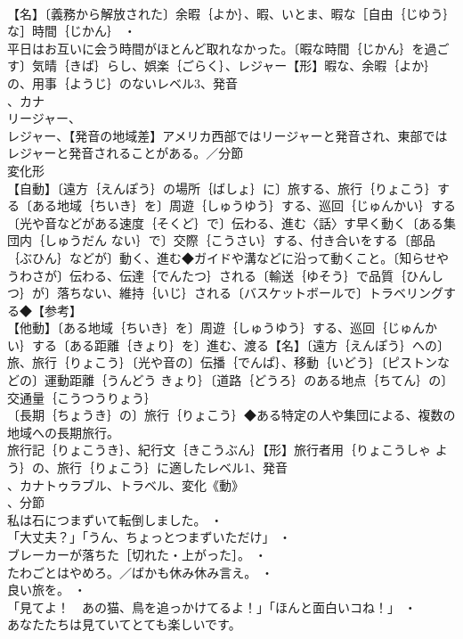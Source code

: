 \documentclass[8pt]{extreport}
\begin{document}
\begin{CJK}{UTF8}{min}
\\	【名】〔義務から解放された〕余暇｛よか｝、暇、いとま、暇な［自由｛じゆう｝な］時間｛じかん｝ ・
\\	平日はお互いに会う時間がほとんど取れなかった。〔暇な時間｛じかん｝を過ごす〕気晴｛きば｝らし、娯楽｛ごらく｝、レジャー【形】暇な、余暇｛よか｝の、用事｛ようじ｝のないレベル3、発音
\\	、カナ
\\	リージャー、
\\	レジャー、【発音の地域差】アメリカ西部ではリージャーと発音され、東部ではレジャーと発音されることがある。／分節
\\	変化形 
\\	【自動】〔遠方｛えんぽう｝の場所｛ばしょ｝に〕旅する、旅行｛りょこう｝する〔ある地域｛ちいき｝を〕周遊｛しゅうゆう｝する、巡回｛じゅんかい｝する〔光や音などがある速度｛そくど｝で〕伝わる、進む〈話〉す早く動く〔ある集団内｛しゅうだん ない｝で〕交際｛こうさい｝する、付き合いをする〔部品｛ぶひん｝などが〕動く、進む◆ガイドや溝などに沿って動くこと。〔知らせやうわさが〕伝わる、伝達｛でんたつ｝される〔輸送｛ゆそう｝で品質｛ひんしつ｝が〕落ちない、維持｛いじ｝される〔バスケットボールで〕トラベリングする◆【参考】
\\	【他動】〔ある地域｛ちいき｝を〕周遊｛しゅうゆう｝する、巡回｛じゅんかい｝する〔ある距離｛きょり｝を〕進む、渡る【名】〔遠方｛えんぽう｝への〕旅、旅行｛りょこう｝〔光や音の〕伝播｛でんぱ｝、移動｛いどう｝〔ピストンなどの〕運動距離｛うんどう きょり｝〔道路｛どうろ｝のある地点｛ちてん｝の〕交通量｛こうつうりょう｝
\\	〔長期｛ちょうき｝の〕旅行｛りょこう｝◆ある特定の人や集団による、複数の地域への長期旅行。
\\	旅行記｛りょこうき｝、紀行文｛きこうぶん｝【形】旅行者用｛りょこうしゃ よう｝の、旅行｛りょこう｝に適したレベル1、発音
\\	、カナトゥラブル、トラベル、変化《動》
\\	、分節
\\	私は石につまずいて転倒しました。 ・
\\	「大丈夫？」「うん、ちょっとつまずいただけ」 ・
\\	ブレーカーが落ちた［切れた・上がった］。 ・
\\	たわごとはやめろ。／ばかも休み休み言え。 ・
\\	良い旅を。 ・
\\	「見てよ！　あの猫、鳥を追っかけてるよ！」「ほんと面白いコね！」 ・
\\	あなたたちは見ていてとても楽しいです。

\end{CJK}
\end{document}
